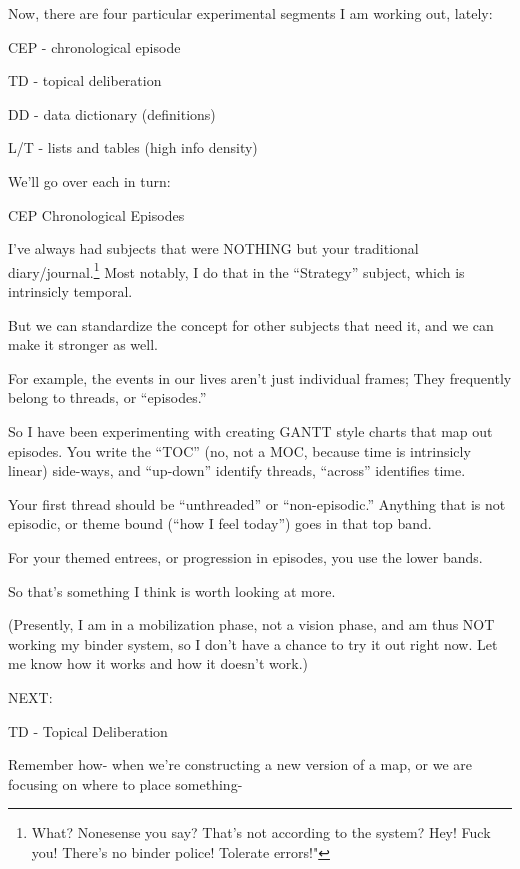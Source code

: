 \documentclass[oneside]{book}
\begin{document}
  Now, there are four particular experimental segments I am working
out, lately:

\begin{description}
\item CEP    - chronological episode
\item TD     - topical deliberation
\item DD     - data dictionary (definitions)
\item L/T    - lists and tables (high info density)
\end{description}

  We'll go over each in turn:

CEP  Chronological Episodes

  I've always had subjects that were NOTHING but your traditional
diary/journal.\footnote
{What? Nonesense you say? That's not according to the
system? Hey! Fuck you! There's no binder police! Tolerate errors!"
}
Most notably, I do that in the ``Strategy'' subject, which is
intrinsicly temporal.

  But we can standardize the concept for other subjects that need it,
and we can make it stronger as well.

  For example, the events in our lives aren't just individual frames;
They frequently belong to threads, or ``episodes.''

  So I have been experimenting with creating GANTT style charts that
map out episodes. You write the ``TOC'' (no, not a MOC, because time is
intrinsicly linear) side-ways, and ``up-down'' identify threads,
``across'' identifies time.

  Your first thread should be ``unthreaded'' or ``non-episodic.'' Anything
that is not episodic, or theme bound (``how I feel today'') goes in
that top band.

  For your themed entrees, or progression in episodes, you use the
lower bands.

  So that's something I think is worth looking at more.

  (Presently, I am in a mobilization phase, not a vision phase, and am
thus NOT working my binder system, so I don't have a chance to try it
out right now. Let me know how it works and how it doesn't work.)

  NEXT:

TD - Topical Deliberation

  Remember how- when we're constructing a new version of a map, or we
are focusing on where to place something-
\end{document}
